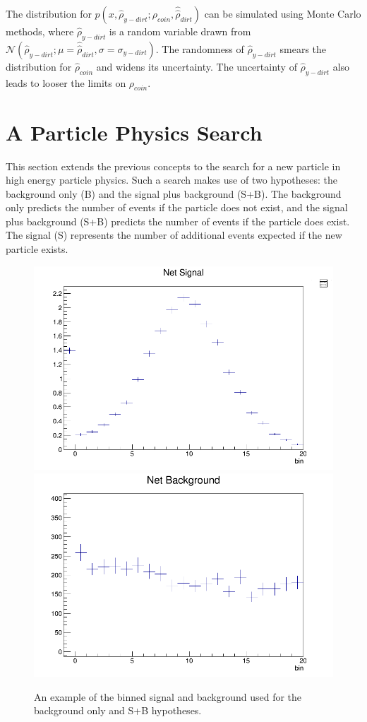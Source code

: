 The distribution for $p(x, \hat{\rho}_{y-dirt}; \rho_{coin}, \hat{\hat{\rho}}_{dirt})$ can be simulated using Monte Carlo methods, where $\hat{\rho}_{y-dirt}$ is a random variable drawn from $\mathcal{N}(\hat{\rho}_{y-dirt}; \mu=\hat{\hat{\rho}}_{dirt}, \sigma=\sigma_{y-dirt})$. The randomness of $\hat{\rho}_{y-dirt}$ smears the distribution for $\hat{\rho}_{coin}$ and widens its uncertainty. The uncertainty of $\hat{\rho}_{y-dirt}$ also leads to looser the limits on $\rho_{coin}$.

\section{A Particle Physics Search}

This section extends the previous concepts to the search for a new particle in high energy particle physics. Such a search makes use of two hypotheses: the background only (B) and the signal plus background (S+B). The background only predicts the number of events if the particle does not exist, and the signal plus background (S+B) predicts the number of events if the particle does exist. The signal (S) represents the number of additional events expected if the new particle exists.

\begin{figure}[h!]
  \centering
  \includegraphics[width=0.49\linewidth]{images/bdt_cats/binning_signal_example.png}
  \includegraphics[width=0.49\linewidth]{images/bdt_cats/binning_bg_example.png}
  \caption[An example of the signal and background used for the background only and S+B hypotheses.]
  {An example of the binned signal and background used for the background only and S+B hypotheses.}
  \label{fig:sb_binning_example}
\end{figure}

